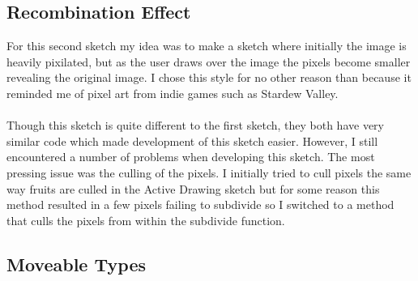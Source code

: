 \documentclass[12pt,a4paper]{article}
\begin{document}
		\subsection{Recombination Effect}
			For this second sketch my idea was to make a sketch where initially the image is heavily 
			pixilated, but as the user draws over the image the pixels become smaller revealing the 
			original image. I chose this style for no other reason than because it reminded me of pixel
			art from indie games such as Stardew Valley.\\\\Though this sketch is quite different to the 
			first sketch, they both have very similar code which made development of this sketch easier.
			However, I still encountered a number of problems when developing this sketch. The most 
			pressing issue was the culling of the pixels. I initially tried to cull pixels the same 
			way fruits are culled in the Active Drawing sketch but for some reason this method resulted 
			in a few pixels failing to subdivide so I switched to a method that culls the pixels from 
			within the subdivide function.

		\subsection{Moveable Types}
\end{document}
